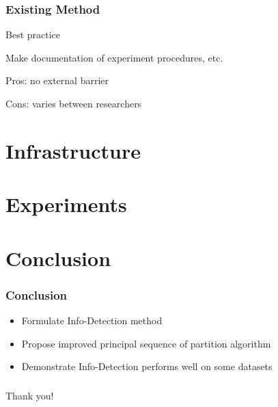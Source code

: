 \documentclass[notheorems]{beamer}
\begin{document}
\begin{frame}
\frametitle{Existing Method}
Best practice

Make documentation of experiment procedures, etc.

Pros: no external barrier

Cons: varies between researchers
\end{frame}
\section{Infrastructure}
\section{Experiments}
\section{Conclusion}
\begin{frame}
\frametitle{Conclusion}
\begin{itemize}
\item Formulate Info-Detection method
\item Propose improved principal sequence of partition algorithm 
\item Demonstrate Info-Detection performs well on some datasets
\end{itemize}
\end{frame}
\begin{frame}
\frametitle{}
\begin{block}{}
\centering
Thank you!
\end{block}
\end{frame}
\end{document}
